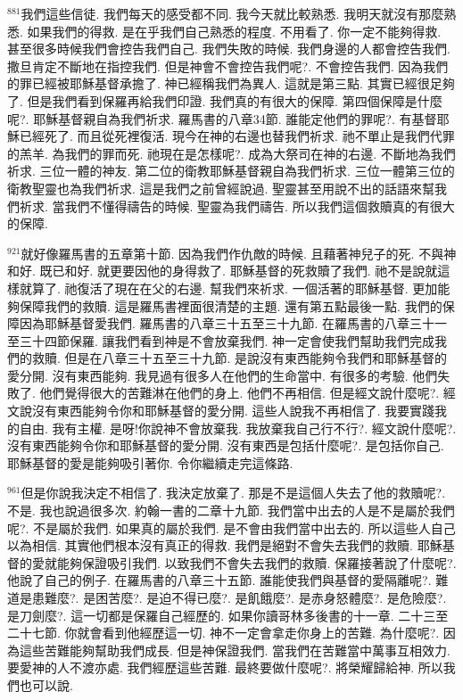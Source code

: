 \documentclass{book}
\begin{document}
$^{881}$我們這些信徒.
我們每天的感受都不同.
我今天就比較熟悉.
我明天就沒有那麼熟悉.
如果我們的得救.
是在乎我們自己熟悉的程度.
不用看了.
你一定不能夠得救.
甚至很多時候我們會控告我們自己.
我們失敗的時候.
我們身邊的人都會控告我們.
撒旦肯定不斷地在指控我們.
但是神會不會控告我們呢?.
不會控告我們.
因為我們的罪已經被耶穌基督承擔了.
神已經稱我們為異人.
這就是第三點.
其實已經很足夠了.
但是我們看到保羅再給我們印證.
我們真的有很大的保障.
第四個保障是什麼呢?.
耶穌基督親自為我們祈求.
羅馬書的八章34節.
誰能定他們的罪呢?.
有基督耶穌已經死了.
而且從死裡復活.
現今在神的右邊也替我們祈求.
祂不單止是我們代罪的羔羊.
為我們的罪而死.
祂現在是怎樣呢?.
成為大祭司在神的右邊.
不斷地為我們祈求.
三位一體的神友.
第二位的衛教耶穌基督親自為我們祈求.
三位一體第三位的衛教聖靈也為我們祈求.
這是我們之前曾經說過.
聖靈甚至用說不出的話語來幫我們祈求.
當我們不懂得禱告的時候.
聖靈為我們禱告.
所以我們這個救贖真的有很大的保障.

$^{921}$就好像羅馬書的五章第十節.
因為我們作仇敵的時候.
且藉著神兒子的死.
不與神和好.
既已和好.
就更要因他的身得救了.
耶穌基督的死救贖了我們.
祂不是說就這樣就算了.
祂復活了現在在父的右邊.
幫我們來祈求.
一個活著的耶穌基督.
更加能夠保障我們的救贖.
這是羅馬書裡面很清楚的主題.
還有第五點最後一點.
我們的保障因為耶穌基督愛我們.
羅馬書的八章三十五至三十九節.
在羅馬書的八章三十一至三十四節保羅.
讓我們看到神是不會放棄我們.
神一定會使我們幫助我們完成我們的救贖.
但是在八章三十五至三十九節.
是說沒有東西能夠令我們和耶穌基督的愛分開.
沒有東西能夠.
我見過有很多人在他們的生命當中.
有很多的考驗.
他們失敗了.
他們覺得很大的苦難淋在他們的身上.
他們不再相信.
但是經文說什麼呢?.
經文說沒有東西能夠令你和耶穌基督的愛分開.
這些人說我不再相信了.
我要實踐我的自由.
我有主權.
是呀!你說神不會放棄我.
我放棄我自己行不行?.
經文說什麼呢?.
沒有東西能夠令你和耶穌基督的愛分開.
沒有東西是包括什麼呢?.
是包括你自己.
耶穌基督的愛是能夠吸引著你.
令你繼續走完這條路.

$^{961}$但是你說我決定不相信了.
我決定放棄了.
那是不是這個人失去了他的救贖呢?.
不是.
我也說過很多次.
約翰一書的二章十九節.
我們當中出去的人是不是屬於我們呢?.
不是屬於我們.
如果真的屬於我們.
是不會由我們當中出去的.
所以這些人自己以為相信.
其實他們根本沒有真正的得救.
我們是絕對不會失去我們的救贖.
耶穌基督的愛就能夠保證吸引我們.
以致我們不會失去我們的救贖.
保羅接著說了什麼呢?.
他說了自己的例子.
在羅馬書的八章三十五節.
誰能使我們與基督的愛隔離呢?.
難道是患難麼?.
是困苦麼?.
是迫不得已麼?.
是飢餓麼?.
是赤身怒體麼?.
是危險麼?.
是刀劍麼?.
這一切都是保羅自己經歷的.
如果你讀哥林多後書的十一章.
二十三至二十七節.
你就會看到他經歷這一切.
神不一定會拿走你身上的苦難.
為什麼呢?.
因為這些苦難能夠幫助我們成長.
但是神保證我們.
當我們在苦難當中萬事互相效力.
要愛神的人不渡亦處.
我們經歷這些苦難.
最終要做什麼呢?.
將榮耀歸給神.
所以我們也可以說.
\end{document}
